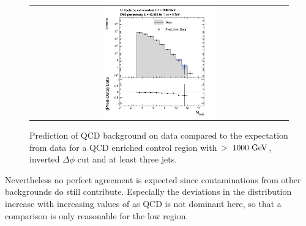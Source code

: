 \begin{figure}[h]
\begin{tabular}{cc}
                \multicolumn{2}{c}{\includegraphics[width=0.45\textwidth]{figures/NJets_presel_HThigh_chsJets_535_Run2012ABCD_data_pt10_withUncertainties_UseRebCorrection_v3.png}}
  \end{tabular}
  \caption{Prediction of QCD background on data compared to the expectation from data for a QCD enriched control region with \HT$>~1000~\rm{GeV}$, inverted $\Delta \phi$ cut and at least three jets.}
  \label{fig:qcd_rs_dataclosure}
\end{figure}
Nevertheless no perfect agreement is expected since contaminations from other backgrounds do still contribute. Especially the deviations in the \MHT distribution increase with increasing values of \MHT as QCD is not dominant here, so that a comparison is only reasonable for the low \MHT region. 


